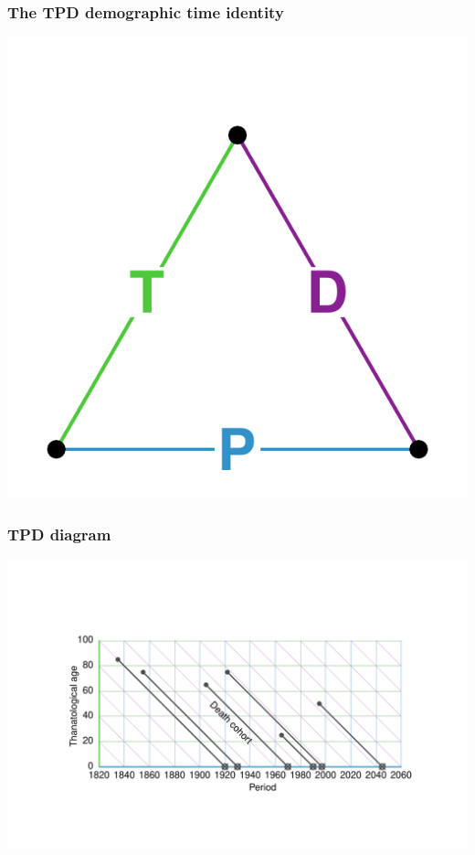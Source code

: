 \documentclass[20pt]{beamer}
\begin{document}

\begin{frame}
\frametitle{The TPD demographic time identity}
\vspace{-4em}
\begin{center}
\includegraphics[scale=1.7]{Figures/TPDid.pdf}
\end{center}
\end{frame}


\begin{frame}
\frametitle{TPD diagram}
\begin{center}
\includegraphics[trim= 200 200 200 200, scale=1.5]{Figures/TPDrt.pdf}
\end{center}
\end{frame}
\end{document}
